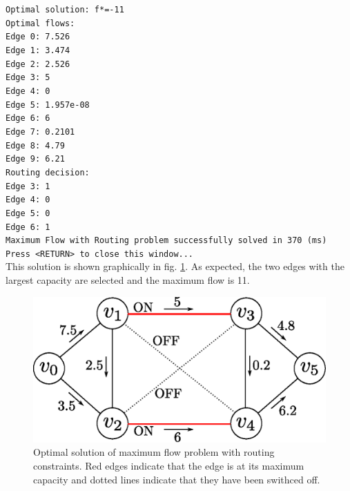 {\footnotesize{\texttt{Optimal solution: f*=-11 \\
Optimal flows: \\
Edge 0: 7.526\\
Edge 1: 3.474\\
Edge 2: 2.526\\
Edge 3: 5\\
Edge 4: 0\\
Edge 5: 1.957e-08\\
Edge 6: 6\\
Edge 7: 0.2101\\
Edge 8: 4.79\\
Edge 9: 6.21\\
Routing decision:\\
Edge 3: 1\\
Edge 4: 0\\
Edge 5: 0\\
Edge 6: 1\\
Maximum Flow with Routing problem successfully solved in 370 (ms)\\
Press <RETURN> to close this window...\\
}}}
This solution is shown graphically in fig. \ref{fig:flownetwork_sol2}. As expected, the two edges with the largest capacity are selected and the maximum flow is 11.
\begin{figure}[H]
\centering
\includegraphics[scale=0.6]{figures/flownetwork_sol2.eps}
\caption{Optimal solution of maximum flow problem with routing constraints. Red edges indicate that the edge is at its maximum capacity and dotted lines indicate that they have been swithced off.}
\label{fig:flownetwork_sol2}
\end{figure}

